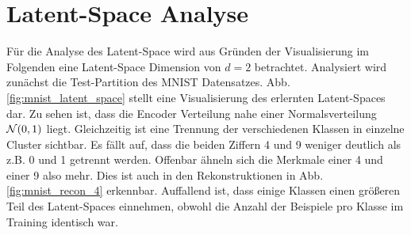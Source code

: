 \section{Latent-Space Analyse}\label{sec:latent_space_analysis}
Für die Analyse des Latent-Space wird aus Gründen der Visualisierung im Folgenden eine Latent-Space Dimension von $d = 2$ betrachtet. Analysiert wird zunächst die Test-Partition des MNIST Datensatzes. Abb. \ref{fig:mnist_latent_space} stellt eine Visualisierung des erlernten Latent-Spaces dar. Zu sehen ist, dass die Encoder Verteilung nahe einer Normalsverteilung $\mathcal{N}(0, 1)$ liegt. Gleichzeitig ist eine Trennung der verschiedenen Klassen in einzelne Cluster sichtbar. Es fällt auf, dass die beiden Ziffern 4 und 9 weniger deutlich als z.B. 0 und 1 getrennt werden. Offenbar ähneln sich die Merkmale einer 4 und einer 9 also mehr. Dies ist auch in den Rekonstruktionen in Abb. \ref{fig:mnist_recon_4} erkennbar. Auffallend ist, dass einige Klassen einen größeren Teil des Latent-Spaces einnehmen, obwohl die Anzahl der Beispiele pro Klasse im Training identisch war.

